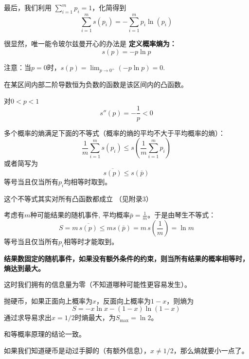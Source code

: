 \documentclass[CJK]{beamer}
\begin{document}
\begin{frame}
\bchL
最后，我们利用 $\sum_{i=1}^m p_i = 1$，化简得到
$$\sum_{i=1}^m s(p_i) = -\sum_{i=1}^m p_i \ln (p_i) $$

很显然，唯一能令玻尔兹曼开心的办法是{\blue \bf
定义概率熵为：
$$s(p) = - p \ln p$$
}

\skipline

注意：当$p=0$时，$s(p) = \lim_{p\rightarrow 0^+} (-p\ln p) = 0$.


\echL
\end{frame}



\begin{frame}
\bchL
{}
\emini
{}
在某区间内部二阶导数恒为负数的函数是该区间内的凸函数。

对$0<p<1$
$$s''(p)  = -\frac{1}{p}<0$$
\emini
\echL
\end{frame}


\begin{frame}
\bchL
多个概率的熵满足下面的不等式（{\blue 概率的熵的平均不大于平均概率的熵}）：
$$\frac{1}{m}\sum_{i=1}^m s(p_i) \le  s\left(\frac{1}{m}\sum_{i=1}^m p_i\right)$$
或者简写为{\blue
$$\overline{s(p)} \le s(\bar{p})$$
等号当且仅当所有$p_i$均相等时取到}。


这个不等式其实对所有凸函数都成立 （见附录3）
\echL
\end{frame}


\begin{frame}
\bchL
考虑有$m$种可能结果的随机事件, 平均概率$\bar{p} =  \frac{1}{m}$。于是由琴生不等式：
$$ S = m\, \overline{s(p)} \le m s(\bar{p}) = m\, s\left(\frac{1}{m}\right) = \ln m$$
等号当且仅当所有$p_i$相等时才能取到。

\skipline

{\bf \blue 结果数固定的随机事件，如果没有额外条件的约束，则当所有结果的概率相等时，熵达到最大。}

这时我们拥有的信息量为零（不知道哪种可能性更容易发生）。

\echL
\end{frame}

\begin{frame}
\bchL

\emini
{}
抛硬币，如果正面向上概率为$x$，反面向上概率为$1-x$，则熵为
$$S = -x\ln x - (1-x)\ln (1-x)$$
通过求导易求出$x = 1/2$时熵最大，为$S_{\max} = \ln 2$。

和等概率原理的结论一致。
\emini

\skiplines

如果我们知道硬币是动过手脚的（有额外信息），$x\ne 1/2$，那么熵就要小一点了。
\echL
\end{frame}
\end{document}
